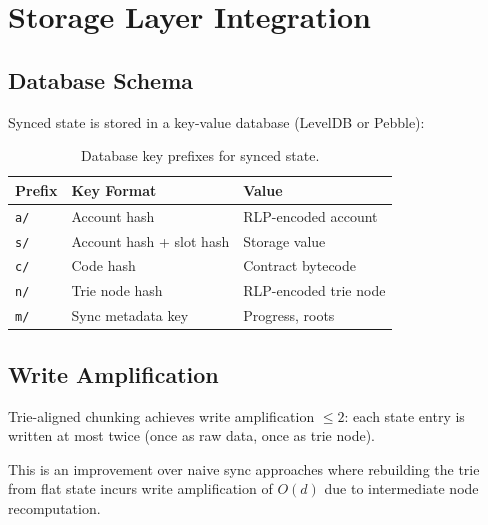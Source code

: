\section{Storage Layer Integration}
\label{sec:storage}

\subsection{Database Schema}

Synced state is stored in a key-value database (LevelDB or Pebble):

\begin{table}[H]
\centering
\caption{Database key prefixes for synced state.}
\label{tab:db}
\begin{tabular}{lll}
\toprule
\textbf{Prefix} & \textbf{Key Format} & \textbf{Value} \\
\midrule
\texttt{a/} & Account hash & RLP-encoded account \\
\texttt{s/} & Account hash + slot hash & Storage value \\
\texttt{c/} & Code hash & Contract bytecode \\
\texttt{n/} & Trie node hash & RLP-encoded trie node \\
\texttt{m/} & Sync metadata key & Progress, roots \\
\bottomrule
\end{tabular}
\end{table}

\subsection{Write Amplification}

\begin{proposition}
Trie-aligned chunking achieves write amplification $\leq 2$: each state entry is written at most twice (once as raw data, once as trie node).
\end{proposition}

This is an improvement over naive sync approaches where rebuilding the trie from flat state incurs write amplification of $O(d)$ due to intermediate node recomputation.


